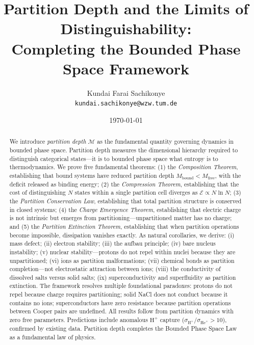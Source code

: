 \documentclass[twocolumn,10pt,a4paper]{article}
\theoremstyle{definition}
\theoremstyle{remark}
\newcommand{\Depth}{\mathcal{M}}
\newcommand{\Cost}{\mathcal{E}}
\newcommand{\Mfree}{M_{\mathrm{free}}}
\newcommand{\Mbound}{M_{\mathrm{bound}}}
\begin{document}
\title{\textbf{Partition Depth and the Limits of Distinguishability: \\
Completing the Bounded Phase Space Framework}}

\author{
Kundai Farai Sachikonye\\
\texttt{kundai.sachikonye@wzw.tum.de}
}

\date{\today}

\maketitle

\begin{abstract}
\noindent We introduce \emph{partition depth} $\Depth$ as the fundamental quantity governing dynamics in bounded phase space. Partition depth measures the dimensional hierarchy required to distinguish categorical states---it is to bounded phase space what entropy is to thermodynamics. We prove five fundamental theorems: (1) the \emph{Composition Theorem}, establishing that bound systems have reduced partition depth $\Mbound < \Mfree$, with the deficit released as binding energy; (2) the \emph{Compression Theorem}, establishing that the cost of distinguishing $N$ states within a single partition cell diverges as $\Cost \propto N\ln N$; (3) the \emph{Partition Conservation Law}, establishing that total partition structure is conserved in closed systems; (4) the \emph{Charge Emergence Theorem}, establishing that electric charge is not intrinsic but emerges from partitioning---unpartitioned matter has no charge; and (5) the \emph{Partition Extinction Theorem}, establishing that when partition operations become impossible, dissipation vanishes exactly. As natural corollaries, we derive: (i) mass defect; (ii) electron stability; (iii) the aufbau principle; (iv) bare nucleus instability; (v) nuclear stability---protons do not repel within nuclei because they are unpartitioned; (vi) ions as partition malformations; (vii) chemical bonds as partition completion---not electrostatic attraction between ions; (viii) the conductivity of dissolved salts versus solid salts; (ix) superconductivity and superfluidity as partition extinction. The framework resolves multiple foundational paradoxes: protons do not repel because charge requires partitioning; solid NaCl does not conduct because it contains no ions; superconductors have zero resistance because partition operations between Cooper pairs are undefined. All results follow from partition dynamics with zero free parameters. Predictions include anomalous $\text{H}^+$ capture ($\sigma_{\text{H}^+}/\sigma_{\text{He}^+} > 10$), confirmed by existing data. Partition depth completes the Bounded Phase Space Law as a fundamental law of physics.
\end{abstract}
\end{document}
